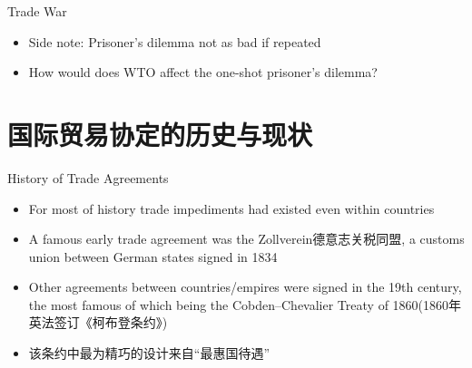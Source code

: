\documentclass[10pt,hyperref={CJKbookmarks=true},xcolor=dvipsnames,aspectratio=169]{beamer}
\begin{document}
\begin{frame}{Trade War}
\begin{itemize}
\item Side note: Prisoner's dilemma not as bad if repeated
\item How would does WTO affect the one-shot prisoner's dilemma?
\end{itemize}
\end{frame}

\section{国际贸易协定的历史与现状}

\begin{frame}{History of Trade Agreements}
\begin{itemize}
	\item For most of history trade impediments had existed
	even within countries
	\item A famous early trade agreement was the Zollverein德意志关税同盟,
	a customs union between German states signed in
	1834
	\item Other agreements between countries/empires
	were signed in the 19th century, the most
	famous of which being the Cobden–Chevalier
	Treaty of 1860(1860年英法签订《柯布登条约》)
	\item 该条约中最为精巧的设计来自“最惠国待遇”
\end{itemize}

\end{frame}
\end{document}
